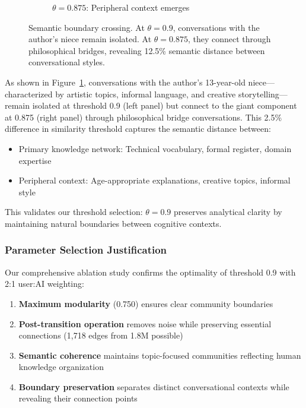 \begin{figure}[h]
\begin{subfigure}{0.48\textwidth}
    \caption{$\theta=0.875$: Peripheral context emerges}
\end{subfigure}
\caption{Semantic boundary crossing. At $\theta=0.9$, conversations with the author's niece remain isolated. At $\theta=0.875$, they connect through philosophical bridges, revealing 12.5\% semantic distance between conversational styles.}
\label{fig:semantic_boundary}
\end{figure}

As shown in Figure~\ref{fig:semantic_boundary}, conversations with the author's 13-year-old niece—characterized by artistic topics, informal language, and creative storytelling—remain isolated at threshold 0.9 (left panel) but connect to the giant component at 0.875 (right panel) through philosophical bridge conversations. This 2.5\% difference in similarity threshold captures the semantic distance between:

\begin{itemize}
    \item Primary knowledge network: Technical vocabulary, formal register, domain expertise
    \item Peripheral context: Age-appropriate explanations, creative topics, informal style
\end{itemize}

This validates our threshold selection: $\theta=0.9$ preserves analytical clarity by maintaining natural boundaries between cognitive contexts.

\subsubsection{Parameter Selection Justification}

Our comprehensive ablation study confirms the optimality of threshold 0.9 with 2:1 user:AI weighting:

\begin{enumerate}
    \item \textbf{Maximum modularity} (0.750) ensures clear community boundaries
    \item \textbf{Post-transition operation} removes noise while preserving essential connections (1,718 edges from 1.8M possible)
    \item \textbf{Semantic coherence} maintains topic-focused communities reflecting human knowledge organization
    \item \textbf{Boundary preservation} separates distinct conversational contexts while revealing their connection points
\end{enumerate}


